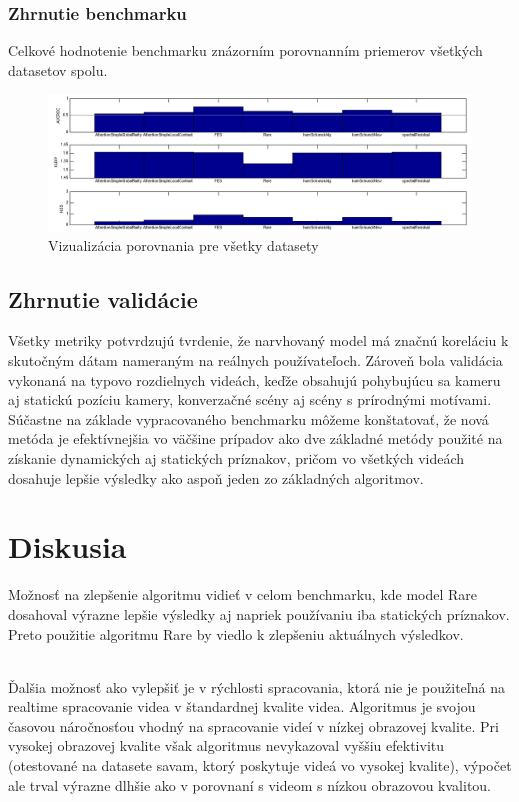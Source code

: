\subsubsection{Zhrnutie benchmarku}
Celkové hodnotenie benchmarku znázorním porovnanním priemerov všetkých datasetov spolu.

\begin{figure}[H]
  \includegraphics[width=15cm]{pics/benchmark.png}
  \caption{Vizualizácia porovnania pre všetky datasety}
\end{figure}

\subsection{Zhrnutie validácie}
Všetky metriky potvrdzujú tvrdenie, že narvhovaný model má značnú koreláciu k skutočným dátam nameraným na reálnych používateľoch.
Zároveň bola validácia vykonaná na typovo rozdielnych videách, keďže obsahujú pohybujúcu sa kameru aj statickú pozíciu kamery, konverzačné scény aj scény s prírodnými motívami.
Súčastne na základe vypracovaného benchmarku môžeme konštatovať, že nová metóda je efektívnejšia vo väčšine prípadov ako dve základné metódy použité na získanie dynamických aj statických príznakov, pričom vo všetkých videách dosahuje lepšie výsledky ako aspoň jeden zo základných algoritmov.

\section{Diskusia}
\label{ssec:diskusia}
Možnosť na zlepšenie algoritmu vidieť v celom benchmarku, kde model Rare\cite{rare-1} dosahoval výrazne lepšie výsledky aj napriek používaniu iba statických príznakov.
Preto použitie algoritmu Rare\cite{rare-1} by viedlo k zlepšeniu aktuálnych výsledkov.

\\

Ďalšia možnosť ako vylepšiť je v rýchlosti spracovania, ktorá nie je použiteľná na realtime spracovanie videa v štandardnej kvalite videa.
Algoritmus je svojou časovou náročnosťou vhodný na spracovanie videí v nízkej obrazovej kvalite.
Pri vysokej obrazovej kvalite však algoritmus nevykazoval vyššiu efektivitu (otestované na datasete savam\cite{savam}, ktorý poskytuje videá vo vysokej kvalite), výpočet ale trval výrazne dlhšie ako v porovnaní s videom s nízkou obrazovou kvalitou.

